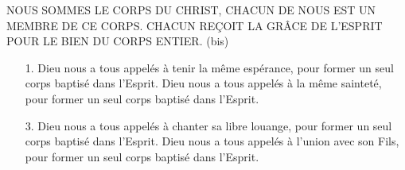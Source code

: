 NOUS SOMMES LE CORPS DU CHRIST,
CHACUN DE NOUS EST UN MEMBRE DE CE CORPS.
CHACUN REÇOIT LA GRÂCE DE L'ESPRIT POUR LE BIEN DU CORPS ENTIER. (bis)
\begin{itemize}
\item[1.]
Dieu nous a tous appelés à tenir la même espérance,
pour former un seul corps baptisé dans l'Esprit.
Dieu nous a tous appelés à la même sainteté,
pour former un seul corps baptisé dans l'Esprit.
\item[3.]
Dieu nous a tous appelés à chanter sa libre louange,
pour former un seul corps baptisé dans l'Esprit.
Dieu nous a tous appelés à l'union avec son Fils,
pour former un seul corps baptisé dans l'Esprit.
\end{itemize}
